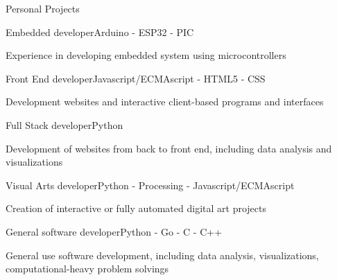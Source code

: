 \documentclass{resume} %
\begin{document}
\begin{rSection}{Personal Projects}

  \begin{rSubsection}{Embedded developer}{Arduino - ESP32 - PIC}{}{}
    \item Experience in developing embedded system using microcontrollers
  \end{rSubsection}

  \begin{rSubsection}{Front End developer}{Javascript/ECMAscript - HTML5 - CSS}{}{}
    \item Development websites and interactive client-based programs and interfaces
  \end{rSubsection}

  \begin{rSubsection}{Full Stack developer}{Python}{}{}
    \item Development of websites from back to front end, including data analysis and visualizations
  \end{rSubsection}

  \begin{rSubsection}{Visual Arts developer}{Python - Processing - Javascript/ECMAscript}{}{}
    \item Creation of interactive or fully automated digital art projects
  \end{rSubsection}

  \begin{rSubsection}{General software developer}{Python - Go - C - C++}{}{}
    \item General use software development, including data analysis, visualizations, computational-heavy problem solvings
  \end{rSubsection}

\end{rSection}

\end{document}
